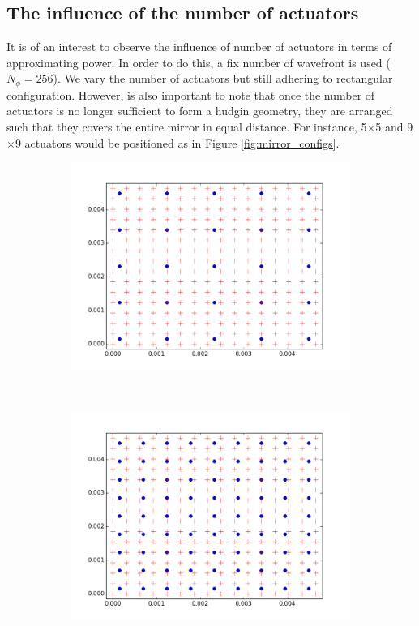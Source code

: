 \documentclass[]{article}
\begin{document}
\subsection{The influence of the number of actuators}
It is of an interest to observe the influence of number of actuators in terms of approximating power. In order to do this, a fix number of wavefront is used ($ N_{\phi} = 256$). We vary the number of actuators but still adhering to rectangular configuration. However, is also important to note that once the number of actuators is no longer sufficient to form a hudgin geometry, they are arranged such that they covers the entire mirror in equal distance. For instance, 5$ \times $5 and 9$ \times $9 actuators would be positioned as in Figure \ref{fig:mirror_configs}.

\begin{figure}[h!]
        \centering
        \begin{subfigure}[b]{0.4\textwidth}
                \includegraphics[width=\textwidth]{figures/mirror_config5}
                \label{fig:mirror_config5}
        \end{subfigure}%
        ~ %
        \begin{subfigure}[b]{0.4\textwidth}
                \includegraphics[width=\textwidth]{figures/mirror_config9}

\end{subfigure}
\end{figure}
\end{document}
